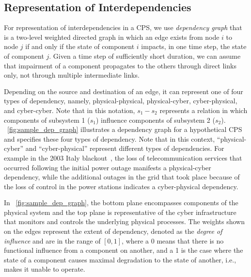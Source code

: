 \documentclass[12pt]{elsarticle}
\begin{document}
\subsection{Representation of Interdependencies}
\label{sec:analysis:repr}
For representation of interdependencies in a CPS, we use \emph{dependency graph} that is a two-level weighted directed graph in which an edge exists from node $i$ to node $j$ if and only if the state of component $i$ impacts, in one time step, the state of component $j$. Given a time step of sufficiently short duration, we can assume that impairment of a component propagates to the others through direct links only, not through multiple intermediate links.

Depending on the source and destination of an edge, it can represent one of four types of dependency, namely, physical-physical, physical-cyber, cyber-physical, and cyber-cyber. Note that in this notation, $s_1-s_2$ represents a relation in which components of subsystem 1 ($s_1$) influence components of subsystem 2 ($s_2$). \figurename~\ref{fig:sample_dep_graph} illustrates a dependency graph for a hypothetical CPS and specifies these four types of dependency. Note that in this context, ``physical-cyber'' and ``cyber-physical'' represent different types of dependencies. For example in the 2003 Italy blackout~\cite{BeA04}, the loss of telecommunication services that occurred following the initial power outage manifests a physical-cyber dependency, while the additional outages in the grid that took place because of the loss of control in the power stations indicates a cyber-physical dependency.

In \figurename~\ref{fig:sample_dep_graph}, the bottom plane encompasses components of the physical system and the top plane is representative of the cyber infrastructure that monitors and controls the underlying physical processes. The weights shown on the edges represent the extent of dependency, denoted as the \emph{degree of influence} and are in the range of $[0, 1]$, where a 0 means that there is no functional influence from a component on another, and a 1 is the case where the state of a component causes maximal degradation to the state of another, i.e., makes it unable to operate.
\end{document}
